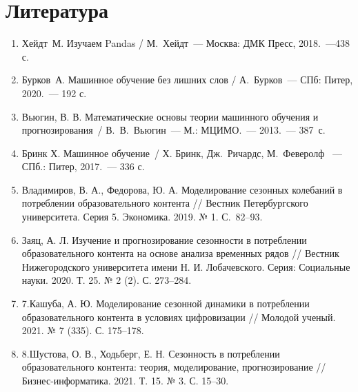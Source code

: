 \documentclass[a4paper,12pt]{article}
\begin{document}
\section{Литература}
\begin{enumerate}
	\item Хейдт М. Изучаем Pandas / М. Хейдт~--- Москва: ДМК Пресс, 2018.~---438 с.
	\item Бурков А. Машинное обучение без лишних слов / А. Бурков~--- СПб: Питер, 2020.~--- 192 с.
	\item Вьюгин, В. В. Математические основы теории машинного обучения и прогнозирования / В. В. Вьюгин~--- М.: МЦИМО. — 2013.~--- 387~с.
	\item Бринк Х. Машинное обучение / Х. Бринк, Дж. Ричардс, М. Феверолф ~--- СПб.: Питер, 2017.~--- 336 с.
	\item Владимиров, В. А., Федорова, Ю. А. Моделирование сезонных колебаний в потреблении образовательного контента // Вестник Петербургского университета. Серия 5. Экономика. 2019. № 1. С.~82--93.
	\item Заяц, А. Л. Изучение и прогнозирование сезонности в потреблении образовательного контента на основе анализа временных рядов // Вестник Нижегородского университета имени Н. И. Лобачевского. Серия: Социальные науки. 2020. Т. 25. № 2 (2). С. 273--284.
	\item 7.Кашуба, А. Ю. Моделирование сезонной динамики в потреблении образовательного контента в условиях цифровизации // Молодой ученый. 2021. № 7 (335). С. 175--178.
	\item 8.Шустова, О. В., Ходьберг, Е. Н. Сезонность в потреблении образовательного контента: теория, моделирование, прогнозирование // Бизнес-информатика. 2021. Т. 15. № 3. С. 15--30.
\end{enumerate}
\end{document}
